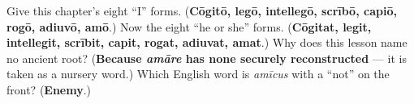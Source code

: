 \begin{tcolorbox}[breakable,colback=teal!4,colframe=teal!35!black,title={Before you move on}]
Give this chapter's eight \textquotedblleft{}I\textquotedblright{} forms. (\textbf{Cōgitō, legō, intellegō, scrībō, capiō, rogō, adiuvō, amō}.) Now the eight \textquotedblleft{}he or she\textquotedblright{} forms. (\textbf{Cōgitat, legit, intellegit, scrībit, capit, rogat, adiuvat, amat}.) Why does this lesson name no ancient root? (\textbf{Because \emph{amāre} has none securely reconstructed} — it is taken as a nursery word.) Which English word is \emph{amīcus} with a \textquotedblleft{}not\textquotedblright{} on the front? (\textbf{Enemy}.)
\end{tcolorbox}

